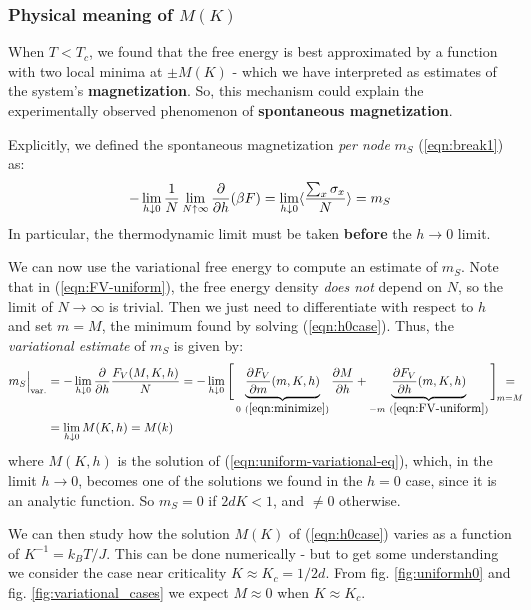 \documentclass[../../main.tex]{subfiles}
\begin{document}
\subsubsection{Physical meaning of $M(K)$}
When $T < T_c$, we found that the free energy is best approximated by a function with two local minima at $\pm M(K)$ - which we have interpreted as estimates of the system's \textbf{magnetization}. So, this mechanism could explain the experimentally observed phenomenon of \textbf{spontaneous magnetization}.

\medskip

Explicitly, we defined the spontaneous magnetization \textit{per node}  $m_S$ (\ref{eqn:break1}) as:
\begin{align}\label{eqn:ms}
    -\lim_{h \downarrow 0} \frac{1}{N} \lim_{N \uparrow \infty} \pdv{h} (\beta F) = \lim_{h \downarrow 0} \langle \frac{\sum_x \sigma_x}{N}  \rangle = m_S
\end{align}
In particular, the thermodynamic limit must be taken \textbf{before} the $h \to 0$ limit.

We can now use the variational free energy to compute an estimate of $m_S$. Note that in (\ref{eqn:FV-uniform}), the free energy density \textit{does not} depend on $N$, so the limit of $N \to \infty$ is trivial. Then we just need to differentiate with respect to $h$ and set $m = M$, the minimum found by solving (\ref{eqn:h0case}). Thus, the \textit{variational estimate} of $m_S$ is given by:
\begin{align}\nonumber
    m_S\Big|_{\mathrm{var.}} &= -\lim_{h \downarrow 0} \pdv{h} \frac{F_V(M, K, h)}{N} = -\lim_{h \downarrow 0} \Bigg[\underbrace{{\pdv{F_V}{m}}(m, K, h)}_{0\ (\ref{eqn:minimize})} \pdv{M}{h} + \underbrace{{\pdv{F_V}{h}}(m, K, h)}_{-m\ (\ref{eqn:FV-uniform})} \Bigg]_{\quad\mathclap{m = M}} \mathclap{=} \\
    &= \lim_{h \downarrow 0} M(K,h) = M(k)
    \label{eqn:variational-spontaneous-magnetization}
\end{align} 
where $M(K,h)$ is the solution of (\ref{eqn:uniform-variational-eq}), which, in the limit $h \to 0$, becomes one of the solutions we found in the $h=0$ case, since it is an analytic function. So $m_S = 0$ if $2dK < 1$, and $\neq 0$ otherwise.

\medskip

We can then study how the solution $M(K)$ of (\ref{eqn:h0case}) varies as a function of $K^{-1} = k_B T/J$. This can be done numerically - but to get some understanding we consider the case near criticality $K \approx K_c = 1/2d$. From fig. \ref{fig:uniformh0} and fig. \ref{fig:variational_cases} we expect $M \approx 0$ when $K \approx K_c$.
\end{document}
